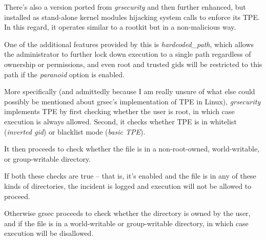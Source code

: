 There's also a version ported from \textit{grsecurity} and then further enhanced, but installed as stand-alone kernel modules hijacking system calls to enforce its TPE. In this regard, it operates similar to a rootkit but in a non-malicious way. 

One of the additional features provided by this is \textit{hardcoded\_path}, which allows the administrator to further lock down execution to a single path regardless of ownership or permissions, and even root and trusted gids will be restricted to this path if the \textit{paranoid} option is enabled. \cite{lkmfaqTPE}

More specifically (and admittedly because I am really unsure of what else could possibly be mentioned about grsec's implementation of TPE in Linux), \textit{grsecurity} implements TPE by first checking whether the user is root, in which case execution is always allowed. Second, it checks whether TPE is in whitelist (\textit{inverted gid}) or blacklist mode (\textit{basic TPE}).

It then proceeds to check whether the file is in a non-root-owned, world-writable, or group-writable directory. 

If both these checks are true – that is, it's enabled and the file is in any of these kinds of directories, the incident is logged and execution will not be allowed to proceed.

Otherwise grsec proceeds to check whether the directory is owned by the user, and if the file is in a world-writable or group-writable directory, in which case execution will be disallowed. \cite{grsecTPEcode}